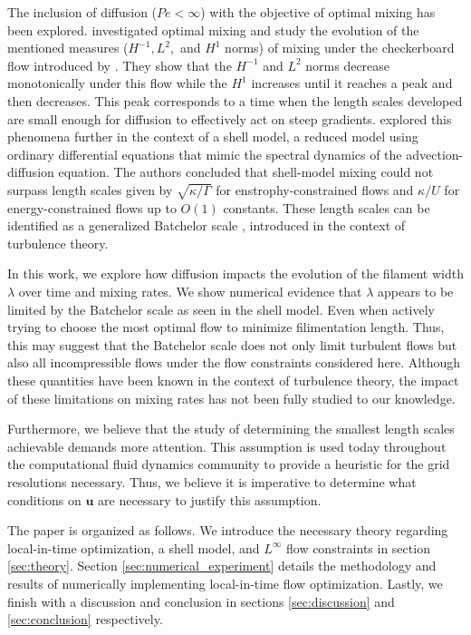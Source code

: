 \documentclass[12pt]{iopart}
\begin{document}
The inclusion of diffusion ($Pe <\infty$) with the objective of optimal mixing has been explored.  \cite{DF2014} investigated optimal mixing and study the evolution of the mentioned measures ($H^{-1}, L^2,$ and $H^1$ norms) of mixing under the checkerboard flow introduced by \cite{JMP2012}. They show that the $H^{-1}$ and $L^2$ norms decrease monotonically under this flow while the $H^{1}$ increases until it reaches a peak and then decreases. This peak corresponds to a  time when the length scales developed are small enough for diffusion to effectively act on steep gradients. \cite{Miles2017a} explored this phenomena further in the context of a shell model, a reduced model using ordinary differential equations that mimic the spectral dynamics of the advection-diffusion equation. The authors concluded that shell-model mixing could not surpass length scales given by $\sqrt{\kappa/ \Gamma}$ for enstrophy-constrained flows and $\kappa/U$ for energy-constrained flows up to $O(1)$ constants. These length scales can be identified as a generalized Batchelor scale \cite{Batchelor1959a}, introduced in the context of turbulence theory. 
 
 
In this work, we explore how diffusion impacts the evolution of the filament width $\lambda$ over time and mixing rates. We show numerical evidence that $\lambda$ appears to be limited by the Batchelor scale as seen in the shell model. Even when actively trying to choose the most optimal flow to minimize filimentation length. Thus, this may suggest that the Batchelor scale does not only limit turbulent flows but also all incompressible flows under the flow constraints considered here. Although these quantities have been known in the context of turbulence theory, the impact of these limitations on mixing rates has not been fully studied to our knowledge.

Furthermore, we believe that the study of determining the smallest length scales achievable demands more attention. This assumption is used today throughout the computational fluid dynamics community to provide a heuristic for the grid resolutions necessary. Thus, we believe it is imperative to determine what conditions on $\mathbf{u}$ are necessary to justify this assumption.

The paper is organized as follows. We introduce the necessary theory regarding local-in-time optimization, a shell model, and $L^{\infty}$ flow constraints in section \ref{sec:theory}. Section \ref{sec:numerical_experiment} details the methodology and results of numerically implementing local-in-time flow optimization. Lastly, we finish with a discussion and conclusion in sections \ref{sec:discussion} and \ref{sec:conclusion} respectively.
\end{document}
